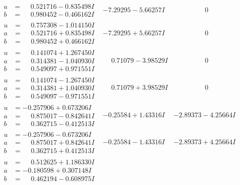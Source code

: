 \documentclass[1p]{elsarticle_modified}
\theoremstyle{definition}
\begin{document}
$$\begin{array}{c|c|c}
\begin{aligned}
a &= \phantom{-}0.521716 - 0.835498 I \\
b &= \phantom{-}0.980452 - 0.466162 I\end{aligned}
 & -7.29295 - 5.66257 I & \phantom{-0.000000 } 0 \\ \hline\begin{aligned}
u &= \phantom{-}0.757308 - 1.014150 I \\
a &= \phantom{-}0.521716 + 0.835498 I \\
b &= \phantom{-}0.980452 + 0.466162 I\end{aligned}
 & -7.29295 + 5.66257 I & \phantom{-0.000000 } 0 \\ \hline\begin{aligned}
u &= \phantom{-}0.141074 + 1.267450 I \\
a &= \phantom{-}0.314381 - 1.040930 I \\
b &= \phantom{-}0.549097 + 0.971551 I\end{aligned}
 & \phantom{-}0.71079 - 3.98529 I & \phantom{-0.000000 } 0 \\ \hline\begin{aligned}
u &= \phantom{-}0.141074 - 1.267450 I \\
a &= \phantom{-}0.314381 + 1.040930 I \\
b &= \phantom{-}0.549097 - 0.971551 I\end{aligned}
 & \phantom{-}0.71079 + 3.98529 I & \phantom{-0.000000 } 0 \\ \hline\begin{aligned}
u &= -0.257906 + 0.673206 I \\
a &= \phantom{-}0.875017 - 0.842641 I \\
b &= \phantom{-}0.362715 - 0.412513 I\end{aligned}
 & -0.25584 + 1.43316 I & -2.89373 - 4.25664 I \\ \hline\begin{aligned}
u &= -0.257906 - 0.673206 I \\
a &= \phantom{-}0.875017 + 0.842641 I \\
b &= \phantom{-}0.362715 + 0.412513 I\end{aligned}
 & -0.25584 - 1.43316 I & -2.89373 + 4.25664 I \\ \hline\begin{aligned}
u &= \phantom{-}0.512625 + 1.186330 I \\
a &= -0.180598 + 0.307148 I \\
b &= \phantom{-}0.462194 - 0.608975 I\end{aligned}

\end{array}$$
\end{document}
